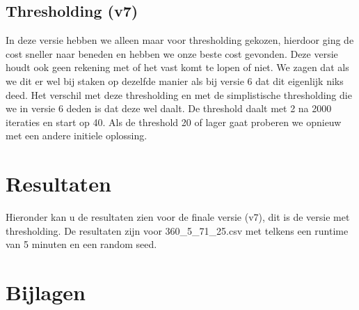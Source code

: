 \documentclass[a4paper, 12pt, one column]{article}
\begin{document}
\subsection{Thresholding (v7)}

In deze versie hebben we alleen maar voor thresholding gekozen, hierdoor ging de cost sneller naar beneden en hebben we onze beste cost gevonden.
Deze versie houdt ook geen rekening met of het vast komt te lopen of niet. We zagen dat als we dit er wel bij staken op dezelfde manier als bij versie 6 dat dit eigenlijk niks deed.
Het verschil met deze thresholding en met de simplistische thresholding die we in versie 6 deden is dat deze wel daalt. De threshold daalt met 2 na 2000 iteraties en start op 40.
Als de threshold 20 of lager gaat proberen we opnieuw met een andere initiele oplossing.

\section{Resultaten}
Hieronder kan u de resultaten zien voor de finale versie (v7), dit is de versie met thresholding. De resultaten zijn voor 360\_5\_71\_25.csv met telkens een runtime van 5 minuten en een random seed.

\begin{center}
\end{center}
\section{Bijlagen}

\end{document}
